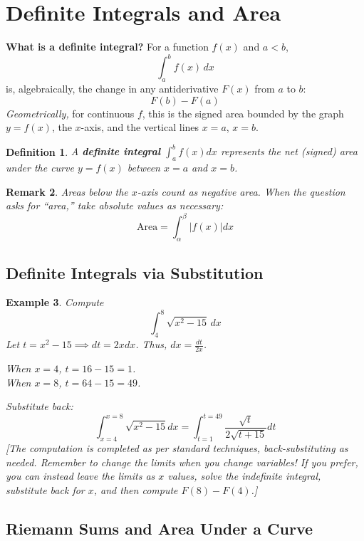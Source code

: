 \documentclass[12pt]{article}
\newtheorem{definition}{Definition}[section]
\newtheorem{example}[definition]{Example}
\newtheorem{remark}[definition]{Remark}
\begin{document}
\section{Definite Integrals and Area}
\textbf{What is a definite integral?} For a function $f(x)$ and $a < b$,
\[
\int_a^b f(x)\,dx
\]
is, algebraically, the change in any antiderivative $F(x)$ from $a$ to $b$:
\[
F(b) - F(a)
\]
\emph{Geometrically,} for continuous $f$, this is the signed area bounded by the graph $y=f(x)$, the $x$-axis, and the vertical lines $x=a$, $x=b$.

\begin{definition}
A \textbf{definite integral} $\displaystyle \int_a^b f(x) dx$ represents the net (signed) area under the curve $y = f(x)$ between $x = a$ and $x = b$.
\end{definition}

\begin{remark}
Areas below the $x$-axis count as \emph{negative} area. When the question asks for ``area,'' take absolute values as necessary:
\[
\text{Area} = \int_{\alpha}^{\beta} |f(x)|dx
\]
\end{remark}

\subsection{Definite Integrals via Substitution}

\begin{example}
Compute
\[
\int_4^8 \sqrt{x^2 - 15} \, dx
\]
Let $t = x^2 - 15 \implies dt = 2x dx$. Thus, $dx = \frac{dt}{2x}$.

When $x=4$, $t = 16-15 = 1$.\\
When $x=8$, $t = 64-15 = 49$.

Substitute back:
\[
\int_{x=4}^{x=8} \sqrt{x^2 - 15} dx = \int_{t=1}^{t=49} \frac{\sqrt{t}}{2\sqrt{t+15}} dt
\]
[The computation is completed as per standard techniques, back-substituting as needed. Remember to \emph{change the limits} when you change variables! If you prefer, you can instead leave the limits as $x$ values, solve the indefinite integral, substitute back for $x$, and then compute $F(8) - F(4)$.]
\end{example}

\subsection{Riemann Sums and Area Under a Curve}
\end{document}
